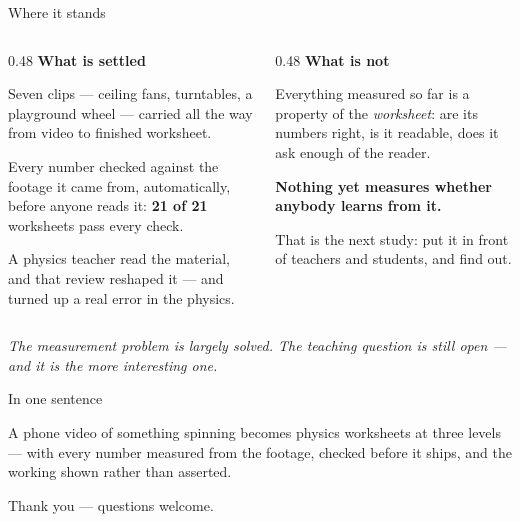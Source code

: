 \documentclass[aspectratio=169,11pt]{beamer}
\newcommand{\takeaway}[1]{\vfill{\small\itshape\color{cGrey}#1\par}}
\begin{document}
\begin{frame}{Where it stands}
\vspace{2pt}
\begin{columns}[T]
\begin{column}{0.48\textwidth}
\textbf{\color{cApp}What is settled}
\vspace{6pt}

{\small
Seven clips --- ceiling fans, turntables, a playground wheel --- carried all the way from video to
finished worksheet.
\vspace{6pt}

Every number checked against the footage it came from, automatically, before anyone reads it:
\textbf{21 of 21} worksheets pass every check.
\vspace{6pt}

A physics teacher read the material, and that review reshaped it --- and turned up a real error in
the physics.}
\end{column}
\begin{column}{0.48\textwidth}
\textbf{\color{cAccent}What is not}
\vspace{6pt}

{\small
Everything measured so far is a property of the \emph{worksheet}: are its numbers right, is it
readable, does it ask enough of the reader.
\vspace{6pt}

\textbf{Nothing yet measures whether anybody learns from it.}
\vspace{6pt}

That is the next study: put it in front of teachers and students, and find out.}
\end{column}
\end{columns}
\takeaway{The measurement problem is largely solved. The teaching question is still open --- and it
is the more interesting one.}
\end{frame}

\begin{frame}{In one sentence}
\vspace{12pt}
\begin{tcolorbox}[colback=cApp!6,colframe=cApp,boxsep=4pt,left=10pt,right=10pt,top=8pt,bottom=8pt]
\large A phone video of something spinning becomes physics worksheets at three levels --- with every
number measured from the footage, checked before it ships, and the working shown rather than
asserted.
\end{tcolorbox}
\vspace{14pt}

\centering
{\large\color{cGrey}Thank you --- questions welcome.}
\end{frame}
\end{document}
